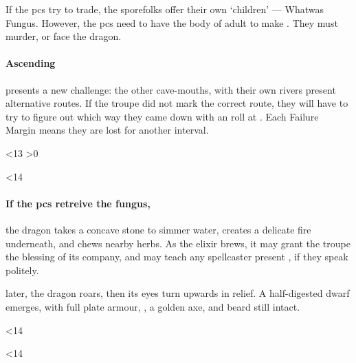 \documentclass[10pt,twoside]{book}
\begin{document}
\wotWosFungus

\noindent
If the \glspl{pc} try to trade, the \glspl{sporefolk} offer their own `children' --- Whatwas Fungus.
However, the \glspl{pc} need to have the body of  adult to make .
They must murder, or face the dragon.

\showTalisman

\paragraph{Ascending}
presents a new challenge: the other cave-mouths, with their own rivers present alternative routes.
If the troupe did not mark the correct route, they will have to try to figure out which way they came down with an  roll at \tn[10].
Each Failure Margin means they are lost for another \gls{interval}.

\ifnum\thepage<13{
  \sporeFolk
  \ifnum\value{Charisma}>0
    \ifSporeSpells%
      {\small{}}
    \fi%
  \fi}
\fi

\ifnum\thepage<14
  \sporeFolk
\fi

\paragraph{If the \glspl{pc} retreive the fungus,}
the dragon takes a concave stone to simmer water, creates a delicate fire underneath, and chews nearby herbs.
As the \gls{elixir} brews, it may grant the troupe the blessing of its company, and may teach any spellcaster present , if they speak politely.

 later, the dragon roars, then its eyes turn upwards in relief.
A half-digested dwarf emerges, with full plate armour, \lootBig, a golden axe, and beard still intact.

\ifnum\thepage<14
  \clearpage
\fi

\ifnum\thepage<14
  \clearpage\null
\fi
\end{document}

